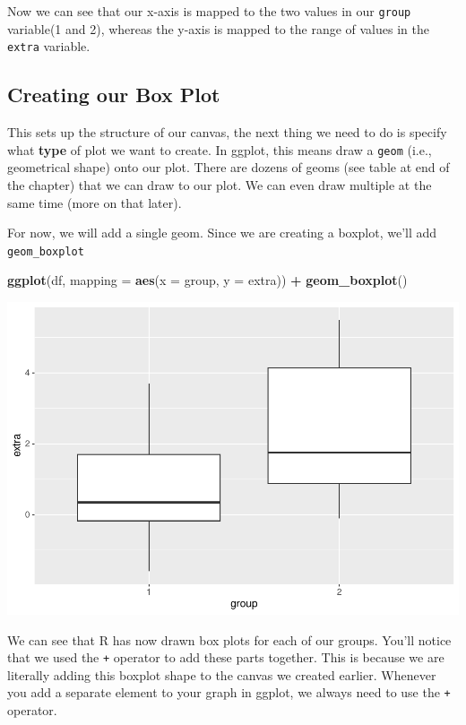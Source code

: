 \documentclass[
]{book}
\newenvironment{Shaded}{\begin{snugshade}}{\end{snugshade}}
\newcommand{\AttributeTok}[1]{\textcolor[rgb]{0.13,0.29,0.53}{#1}}
\newcommand{\FunctionTok}[1]{\textcolor[rgb]{0.13,0.29,0.53}{\textbf{#1}}}
\newcommand{\NormalTok}[1]{#1}
\newcommand{\SpecialCharTok}[1]{\textcolor[rgb]{0.81,0.36,0.00}{\textbf{#1}}}
\begin{document}
Now we can see that our x-axis is mapped to the two values in our \texttt{group} variable(1 and 2), whereas the y-axis is mapped to the range of values in the \texttt{extra} variable.

\hypertarget{creating-our-box-plot}{%
\subsection{Creating our Box Plot}\label{creating-our-box-plot}}

This sets up the structure of our canvas, the next thing we need to do is specify what \textbf{type} of plot we want to create. In ggplot, this means draw a \texttt{geom} (i.e., geometrical shape) onto our plot. There are dozens of geoms (see table at end of the chapter) that we can draw to our plot. We can even draw multiple at the same time (more on that later).

For now, we will add a single geom. Since we are creating a boxplot, we'll add \texttt{geom\_boxplot}

\begin{Shaded}
\begin{Highlighting}[]
\FunctionTok{ggplot}\NormalTok{(df, }\AttributeTok{mapping =} \FunctionTok{aes}\NormalTok{(}\AttributeTok{x =}\NormalTok{ group, }\AttributeTok{y =}\NormalTok{ extra)) }\SpecialCharTok{+}
  \FunctionTok{geom\_boxplot}\NormalTok{()}
\end{Highlighting}
\end{Shaded}

\includegraphics{rintro_demo_files/figure-latex/unnamed-chunk-279-1.pdf}

We can see that R has now drawn box plots for each of our groups. You'll notice that we used the \texttt{+} operator to add these parts together. This is because we are literally adding this boxplot shape to the canvas we created earlier. Whenever you add a separate element to your graph in ggplot, we always need to use the \texttt{+} operator.
\end{document}
